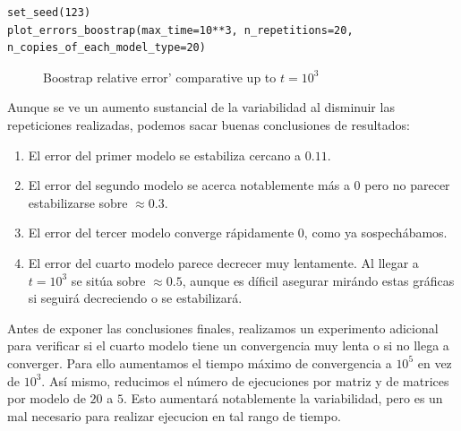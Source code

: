 \documentclass[a4paper]{article}
\begin{document}
\begin{verbatim}
set_seed(123)
plot_errors_boostrap(max_time=10**3, n_repetitions=20, n_copies_of_each_model_type=20)
\end{verbatim}

\begin{figure}[H]
	\centering
	\caption{Boostrap relative error' comparative up to $t=10^3$}
\end{figure}

Aunque se ve un aumento sustancial de la variabilidad al disminuir las repeticiones realizadas, podemos sacar buenas conclusiones de resultados:

\begin{enumerate}
	\item El error del primer modelo se estabiliza cercano a $0.11$.
	\item El error del segundo modelo se acerca notablemente más a $0$ pero no parecer estabilizarse sobre $\approx 0.3$. 
	\item El error del tercer modelo converge rápidamente $0$, como ya sospechábamos. 
	\item El error del cuarto modelo parece decrecer muy lentamente. Al llegar a $t=10^3$ se sitúa sobre  $\approx 0.5$, aunque es díficil asegurar mirándo estas gráficas si seguirá decreciendo o se estabilizará. 
\end{enumerate}

Antes de exponer las conclusiones finales, realizamos un experimento adicional para verificar si el cuarto modelo tiene un convergencia muy lenta o si no llega a converger. Para ello aumentamos el tiempo máximo de convergencia a $10^5$ en vez de $10^3$. Así mismo, reducimos el número de ejecuciones por matriz y de matrices por modelo de $20$ a $5$. Esto aumentará notablemente la variabilidad, pero es un mal necesario para realizar ejecucion en tal rango de tiempo.
\end{document}

